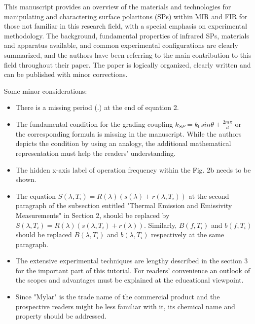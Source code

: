 \documentclass[12pt,a4paper]{article}
\begin{document}
This manuscript provides an overview of the materials and technologies for manipulating and charactering surface polaritons (SPs) within MIR and FIR for those not familiar in this research field, with a special emphasis on experimental methodology. The background, fundamental properties of infrared SPs, materials and apparatus available, and common experimental configurations are clearly summarized, and the authors have been referring to the main contribution to this field throughout their paper. The paper is logically organized, clearly written and can be published with minor corrections. 

\noindent
Some minor considerations:
\begin{itemize}

\item There is a missing period (.) at the end of equation 2. 

\item The fundamental condition for the grading coupling $k_{SP} = k_0 sin \theta + \frac{2m \pi}{d}$ or the corresponding formula is missing in the manuscript. While the authors depicts the condition by using an analogy, the additional mathematical representation must help the readers' understanding. 

\item The hidden x-axis label of operation frequency within the Fig. 2b needs to be shown.

\item The equation $S(\lambda,T_i) = R(\lambda)(s(\lambda)+r(\lambda,T_i))$ at the second paragraph of the subsection entitled "Thermal Emission and Emissivity Measurements" in Section 2, should be replaced by $S(\lambda,T_i) = R(\lambda)(s(\lambda,T_i)+r(\lambda))$. Similarly, $B(f,T_i)$ and $b(f,T_i)$ should be replaced $B(\lambda,T_i)$ and $b(\lambda,T_i)$ respectively at the same paragraph. 

\item The extensive experimental techniques are lengthy described in the section 3 for the important part of this tutorial.  For readers' convenience an outlook of the scopes and advantages must be explained at the educational viewpoint. 

\item Since "Mylar" is the trade name of the commercial product and the prospective readers might be less familiar with it, its chemical name and property should be addressed.


\end{itemize}
\end{document}
